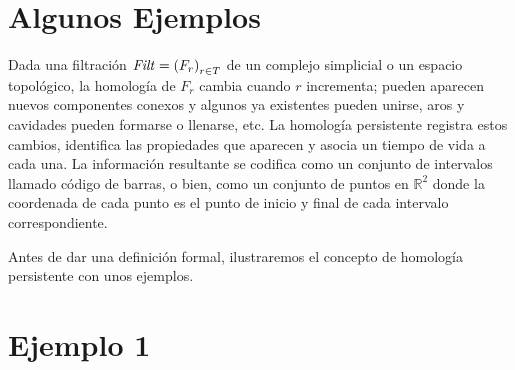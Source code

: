 \section{Algunos Ejemplos}\label{sec: 4.2}

Dada una filtraci\'on $\mathit{Filt} = \left(F_{r}\right)_{r\in T}$ de un complejo simplicial o un espacio
topol\'ogico, la homolog\'ia de $F_{r}$ cambia cuando $r$ incrementa; pueden aparecen nuevos componentes
conexos y algunos ya existentes pueden unirse, aros y cavidades pueden formarse o llenarse, etc. La
homolog\'ia persistente registra estos cambios, identifica las propiedades que aparecen y asocia un
tiempo de vida a cada una. La informaci\'on resultante se codifica como un conjunto de intervalos llamado
c\'odigo de barras, o bien, como un conjunto de puntos en $\mathbb{R}^{2}$ donde la coordenada de
cada punto es el punto de inicio y final de cada intervalo correspondiente.

Antes de dar una definici\'on formal, ilustraremos el concepto de homolog\'ia persistente con unos
ejemplos.


\section*{Ejemplo 1}

